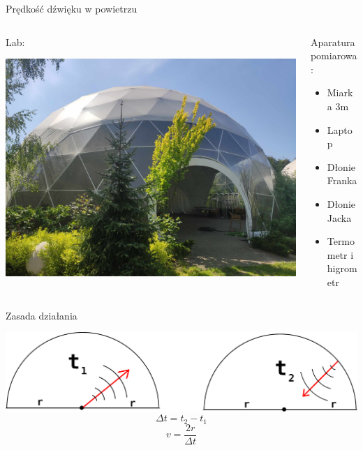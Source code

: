 \documentclass{beamer}
\begin{document}
\begin{frame}{Prędkość dźwięku w powietrzu}

	\begin{columns}
		\begin{column}{0.5\textwidth}
			Lab: \pause

			\includegraphics[width=\linewidth]{lab_KlaKop.jpg} \pause
		\end{column}
		\begin{column}{0.5\textwidth}
			Aparatura pomiarowa: \pause
			\begin{itemize}
				\item Miarka 3m \pause
				\item Laptop \pause
				\item Dłonie Franka \pause
				\item Dłonie Jacka \pause
				\item Termometr i higrometr
			\end{itemize}
		\end{column}
	\end{columns}

\end{frame}

\begin{frame}{Zasada działania}

	\includegraphics[width=\linewidth]{wave.png}
	$$\Delta t=t_2-t_1$$
	$$v=\frac{2r}{\Delta t}$$

\end{frame}
\end{document}
